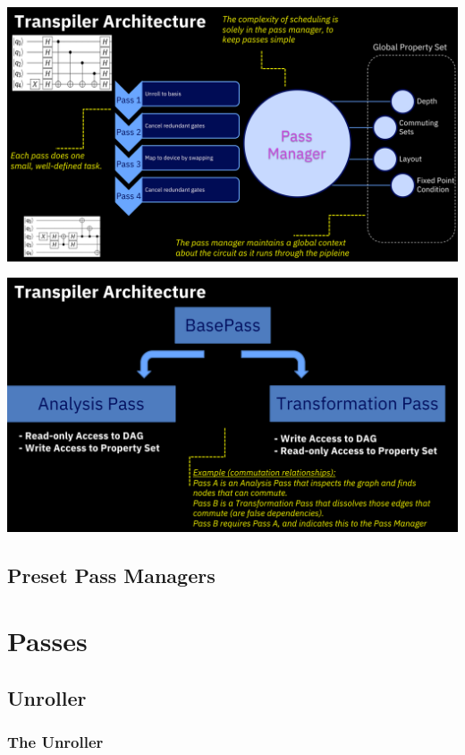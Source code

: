 \documentclass[aspectratio=169,11pt,hyperref={colorlinks=true}]{beamer}
\begin{document}
{
\begin{frame}
    \includegraphics[width=\textwidth]{passmanager.png}
\end{frame}

\begin{frame}
    \includegraphics[width=\textwidth]{passmanager_2.png}
\end{frame}
}
\subsection{Preset Pass Managers}


\section{Passes}
\subsection{Unroller}
\begin{frame}
    \frametitle{The Unroller}
\end{frame}
\end{document}
